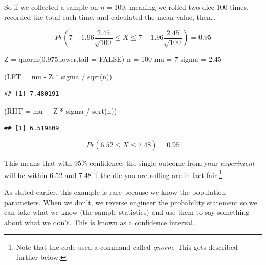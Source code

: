 \documentclass[
]{book}
\newenvironment{Shaded}{\begin{snugshade}}{\end{snugshade}}
\newcommand{\AttributeTok}[1]{\textcolor[rgb]{0.77,0.63,0.00}{#1}}
\newcommand{\ConstantTok}[1]{\textcolor[rgb]{0.00,0.00,0.00}{#1}}
\newcommand{\DecValTok}[1]{\textcolor[rgb]{0.00,0.00,0.81}{#1}}
\newcommand{\FloatTok}[1]{\textcolor[rgb]{0.00,0.00,0.81}{#1}}
\newcommand{\FunctionTok}[1]{\textcolor[rgb]{0.00,0.00,0.00}{#1}}
\newcommand{\NormalTok}[1]{#1}
\newcommand{\OtherTok}[1]{\textcolor[rgb]{0.56,0.35,0.01}{#1}}
\newcommand{\SpecialCharTok}[1]{\textcolor[rgb]{0.00,0.00,0.00}{#1}}
\begin{document}
So if we collected a sample on \(n=100\), meaning we rolled two dice 100 times, recorded the total each time, and calculated the mean value, then\ldots{}

\[Pr\left( 7-1.96 \frac{2.45}{\sqrt{100}} \leq \bar{X} \leq 7-1.96 \frac{2.45}{\sqrt{100}} \right) = 0.95\]

\begin{Shaded}
\begin{Highlighting}[]
\NormalTok{Z }\OtherTok{=} \FunctionTok{qnorm}\NormalTok{(}\FloatTok{0.975}\NormalTok{,}\AttributeTok{lower.tail =} \ConstantTok{FALSE}\NormalTok{)}
\NormalTok{n }\OtherTok{=} \DecValTok{100}
\NormalTok{mu }\OtherTok{=} \DecValTok{7}
\NormalTok{sigma }\OtherTok{=} \FloatTok{2.45}

\NormalTok{(}\AttributeTok{LFT =}\NormalTok{ mu }\SpecialCharTok{{-}}\NormalTok{ Z }\SpecialCharTok{*}\NormalTok{ sigma }\SpecialCharTok{/} \FunctionTok{sqrt}\NormalTok{(n))}
\end{Highlighting}
\end{Shaded}

\begin{verbatim}
## [1] 7.480191
\end{verbatim}

\begin{Shaded}
\begin{Highlighting}[]
\NormalTok{(}\AttributeTok{RHT =}\NormalTok{ mu }\SpecialCharTok{+}\NormalTok{ Z }\SpecialCharTok{*}\NormalTok{ sigma }\SpecialCharTok{/} \FunctionTok{sqrt}\NormalTok{(n))}
\end{Highlighting}
\end{Shaded}

\begin{verbatim}
## [1] 6.519809
\end{verbatim}

\[Pr(6.52 \leq \bar{X} \leq 7.48) = 0.95\]

This means that with 95\% confidence, the single outcome from your \emph{experiment} will be within 6.52 and 7.48 if the die you are rolling are in fact fair.\footnote{Note that the code used a command called \emph{qnorm}. This gets described further below.}

As stated earlier, this example is rare because we know the population parameters. When we don't, we reverse engineer the probability statement so we can take what we know (the sample statistics) and use them to say something about what we don't. This is known as a confidence interval.
\end{document}

